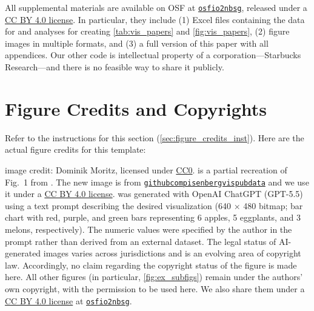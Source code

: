 \documentclass[journal]{vgtc}                     %
\begin{document}
All supplemental materials are available on OSF at \href{https://doi.org/10.17605/OSF.IO/2NBSG}{\texttt{osfio\discretionary{/}{}{/}2nbsg}}, released under a \href{https://creativecommons.org/licenses/by/4.0/}{\ccby{} CC BY 4.0 license}.
In particular, they include (1) Excel files containing the data for and analyses for creating \cref{tab:vis_papers} and \cref{fig:vis_papers}, (2) figure images in multiple formats, and (3) a full version of this paper with all appendices.
Our other code is intellectual property of a corporation---Starbucks Research---and there is no feasible way to share it publicly.


\section*{Figure Credits and Copyrights}
\label{sec:figure_credits}

Refer to the instructions for this section (\cref{sec:figure_credits_inst}).
Here are the actual figure credits for this template:

 image credit: Dominik Moritz, licensed under \href{https://creativecommons.org/public-domain/cc0/}{CC0}.
 is a partial recreation of Fig.\ 1 from \cite{Isenberg2017Vispubdata.orgMetadataCollection}. The new image is from \href{https://github.com/pisenberg/vispubdata/}{\texttt{githubcom\discretionary{/}{}{/}pisenberg\discretionary{/}{}{/}vispubdata}} and we use it under a \href{https://creativecommons.org/licenses/by/4.0/}{\ccby{} CC BY 4.0 license}. 
 was generated with OpenAI ChatGPT (GPT-5.5) using a text prompt describing the desired visualization (640 × 480 bitmap; bar chart with red, purple, and green bars representing 6 apples, 5 eggplants, and 3 melons, respectively). The numeric values were specified by the author in the prompt rather than derived from an external dataset. The legal status of AI-generated images varies across jurisdictions and is an evolving area of copyright law. Accordingly, no claim regarding the copyright status of the figure is made here. 
All other figures (in particular, \cref{fig:ex_subfigs}) remain under the authors' own copyright, with the permission to be used here. We also share them under a \href{https://creativecommons.org/licenses/by/4.0/}{\ccby{} CC BY 4.0 license} at \href{https://doi.org/10.17605/OSF.IO/2NBSG}{\texttt{osfio\discretionary{/}{}{/}2nbsg}}.


\end{document}
